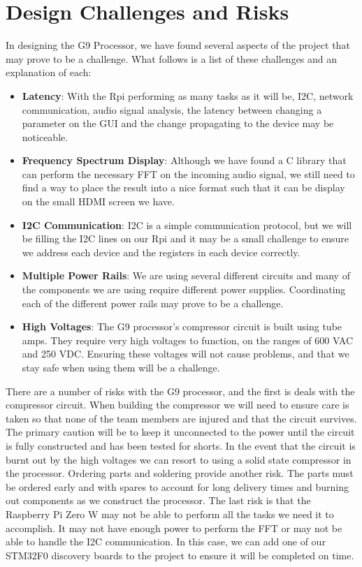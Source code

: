 \documentclass[journal]{IEEEtran}
\begin{document}
	\section{Design Challenges and Risks}
	In designing the G9 Processor, we have found several aspects of the project that may prove to be a challenge.  What follows is a list of these challenges and an explanation of each:
	\begin{itemize}
		\item \textbf{Latency}: With the Rpi performing as many tasks as it will be, I2C, network communication, audio signal analysis, the latency between changing a parameter on the GUI and the change propagating to the device may be noticeable.
		\item \textbf{Frequency Spectrum Display}: Although we have found a C library that can perform the necessary FFT on the incoming audio signal, we still need to find a way to place the result into a nice format such that it can be display on the small HDMI screen we have.
		\item \textbf{I2C Communication}: I2C is a simple communication protocol, but we will be filling the I2C lines on our Rpi and it may be a small challenge to ensure we address each device and the registers in each device correctly.
		\item \textbf{Multiple Power Rails}: We are using several different circuits and many of the components we are using require different power supplies.  Coordinating each of the different power rails may prove to be a challenge.
		\item \textbf{High Voltages}: The G9 processor's compressor circuit is built using tube amps.  They require very high voltages to function, on the ranges of 600 VAC and 250 VDC.  Ensuring these voltages will not cause problems, and that we stay safe when using them will be a challenge.
	\end{itemize}
	
	There are a number of risks with the G9 processor, and the first is deals with the compressor circuit.  When building the compressor we will need to ensure care is taken so that none of the team members are injured and that the circuit survives.  The primary caution will be to keep it unconnected to the power until the circuit is fully constructed and has been tested for shorts.  In the event that the circuit is burnt out by the high voltages we can resort to using a solid state compressor in the processor.  Ordering parts and soldering provide another risk.  The parts must be ordered early and with spares to account for long delivery times and burning out components as we construct the processor.  The last risk is that the Raspberry Pi Zero W may not be able to perform all the tasks we need it to accomplish.  It may not have enough power to perform the FFT or may not be able to handle the I2C communication.  In this case, we can add one of our STM32F0 discovery boards to the project to ensure it will be completed on time.
	
\end{document}
